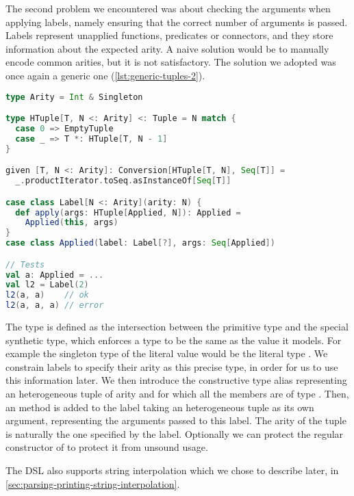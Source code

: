 The second problem we encountered was about checking the arguments when applying labels, namely ensuring that the correct number of arguments is passed. Labels represent unapplied functions, predicates or connectors, and they store information about the expected arity. A naive solution would be to manually encode common arities, but it is not satisfactory. The solution we adopted was once again a generic one (\autoref{lst:generic-tuples-2}).

\begin{lstlisting}[language=Scala,caption={[Generic tuples (2)]{Generic tuples: enforcing correct function application arity. The type \code{HTuble} represents an homogeneous tuple, \code{Label} is a function label and \code{Applied} is an applied function.}},label={lst:generic-tuples-2}]
type Arity = Int & Singleton

type HTuple[T, N <: Arity] <: Tuple = N match {
  case 0 => EmptyTuple
  case _ => T *: HTuple[T, N - 1]
}

given [T, N <: Arity]: Conversion[HTuple[T, N], Seq[T]] =
  _.productIterator.toSeq.asInstanceOf[Seq[T]]

case class Label[N <: Arity](arity: N) {
  def apply(args: HTuple[Applied, N]): Applied =
    Applied(this, args)
}
case class Applied(label: Label[?], args: Seq[Applied])

// Tests
val a: Applied = ...
val l2 = Label(2)
l2(a, a)    // ok
l2(a, a, a) // error
\end{lstlisting}

The type  is defined as the intersection between the primitive  type and the special  synthetic type, which enforces a type to be the same as the value it models. For example the singleton type of the literal value  would be the literal type . We constrain labels to specify their arity as this precise type, in order for us to use this information later. We then introduce the constructive type alias  representing an heterogeneous tuple of arity  and for which all the members are of type . Then, an  method is added to the label taking an heterogeneous tuple as its own argument, representing the arguments passed to this label. The arity of the tuple is naturally the one specified by the label. Optionally we can protect the regular constructor of  to protect it from unsound usage.

The DSL also supports string interpolation which we chose to describe later, in \autoref{sec:parsing-printing-string-interpolation}.
